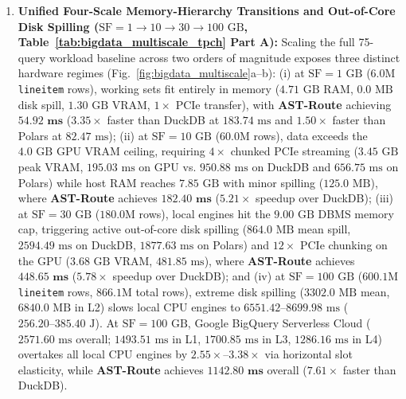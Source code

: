 \documentclass[10pt,a4paper]{article}
\begin{document}
\begin{enumerate}[leftmargin=1.5em,itemsep=2pt]
    \item \textbf{Unified Four-Scale Memory-Hierarchy Transitions and Out-of-Core Disk Spilling ($\text{SF}=1 \rightarrow 10 \rightarrow 30 \rightarrow 100\text{ GB}$, Table~\ref{tab:bigdata_multiscale_tpch} Part A):} Scaling the full 75-query workload baseline across two orders of magnitude exposes three distinct hardware regimes (Fig.~\ref{fig:bigdata_multiscale}a--b): (i) at $\text{SF}=1\text{ GB}$ ($6.0\text{M}$ \texttt{lineitem} rows), working sets fit entirely in memory ($4.71\text{ GB}$ RAM, $0.0\text{ MB}$ disk spill, $1.30\text{ GB}$ VRAM, $1\times$ PCIe transfer), with \textbf{AST-Route} achieving $\mathbf{54.92\text{ ms}}$ ($3.35\times$ faster than DuckDB at $183.74\text{ ms}$ and $1.50\times$ faster than Polars at $82.47\text{ ms}$); (ii) at $\text{SF}=10\text{ GB}$ ($60.0\text{M}$ rows), data exceeds the $4.0\text{ GB}$ GPU VRAM ceiling, requiring $4\times$ chunked PCIe streaming ($3.45\text{ GB}$ peak VRAM, $195.03\text{ ms}$ on GPU vs. $950.88\text{ ms}$ on DuckDB and $656.75\text{ ms}$ on Polars) while host RAM reaches $7.85\text{ GB}$ with minor spilling ($125.0\text{ MB}$), where \textbf{AST-Route} achieves $\mathbf{182.40\text{ ms}}$ ($\mathbf{5.21\times}$ speedup over DuckDB); (iii) at $\text{SF}=30\text{ GB}$ ($180.0\text{M}$ rows), local engines hit the $9.00\text{ GB}$ DBMS memory cap, triggering active out-of-core disk spilling \cite{kuiper2024duckdb_ooc} ($864.0\text{ MB}$ mean spill, $2594.49\text{ ms}$ on DuckDB, $1877.63\text{ ms}$ on Polars) and $12\times$ PCIe chunking on the GPU ($3.68\text{ GB}$ VRAM, $481.85\text{ ms}$), where \textbf{AST-Route} achieves $\mathbf{448.65\text{ ms}}$ ($\mathbf{5.78\times}$ speedup over DuckDB); and (iv) at $\text{SF}=100\text{ GB}$ ($600.1\text{M}$ \texttt{lineitem} rows, $866.1\text{M}$ total rows), extreme disk spilling ($3302.0\text{ MB}$ mean, $6840.0\text{ MB}$ in L2) slows local CPU engines to $6551.42\text{--}8699.98\text{ ms}$ ($256.20\text{--}385.40\text{ J}$). At $\text{SF}=100\text{ GB}$, Google BigQuery Serverless Cloud ($2571.60\text{ ms}$ overall; $1493.51\text{ ms}$ in L1, $1700.85\text{ ms}$ in L3, $1286.16\text{ ms}$ in L4) overtakes all local CPU engines by $\mathbf{2.55\times\text{--}3.38\times}$ via horizontal slot elasticity, while \textbf{AST-Route} achieves $\mathbf{1142.80\text{ ms}}$ overall ($\mathbf{7.61\times}$ faster than DuckDB).

\end{enumerate}
\end{document}
